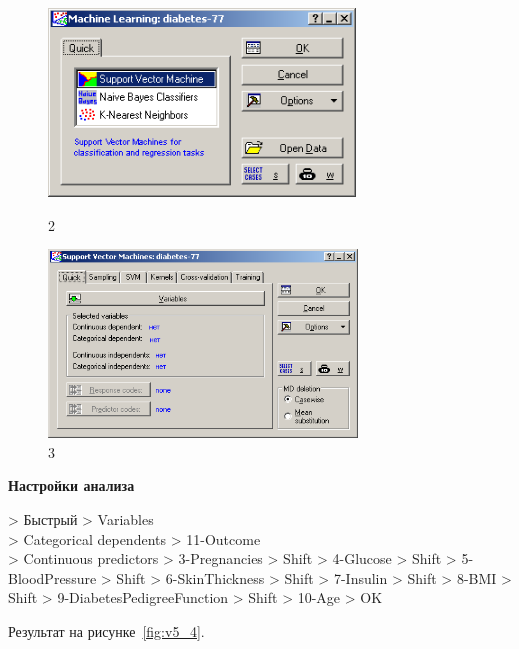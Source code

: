 \begin{figure}[!h]
  \centering

  \begin{minipage}{0.49\textwidth}
    \centering

    \includegraphics[height=5cm]
    {inc/v5_2.PNG}

    \caption{2}

    \label{fig:v5_2}
  \end{minipage}
  \begin{minipage}{0.49\textwidth}
    \centering

    \includegraphics[height=5cm]
    {inc/v5_3.PNG}

    \caption{3}

    \label{fig:v5_3}
  \end{minipage}
\end{figure}

\begin{center}
  \textbf{Настройки анализа}
\end{center}

> Быстрый > Variables \\
> Categorical dependents > 11-Outcome \\
> Continuous predictors > 3-Pregnancies
> Shift > 4-Glucose
> Shift > 5-BloodPressure
> Shift > 6-SkinThickness
> Shift > 7-Insulin
> Shift > 8-BMI
> Shift > 9-DiabetesPedigreeFunction
> Shift > 10-Age
> OK

Результат на рисунке~\ref{fig:v5_4}.

